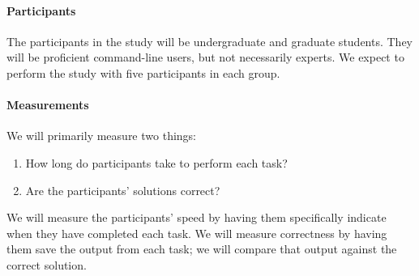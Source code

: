 \paragraph{Participants} The participants in the study will be undergraduate and
graduate students. They will be proficient command-line users, but not
necessarily experts. We expect to perform the study with five participants in
each group.

\paragraph{Measurements} We will primarily measure two things:
\begin{enumerate}
    \item How long do participants take to perform each task?
    \item Are the participants' solutions correct?
\end{enumerate}
We will measure the participants' speed by having them specifically indicate
when they have completed each task. We will measure correctness by having them
save the output from each task; we will compare that output against the correct
solution.
